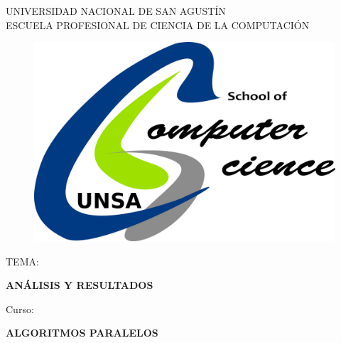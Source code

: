 

\begin{titlepage}

\begin{center}
\vspace*{-1in}

\begin{large}
UNIVERSIDAD NACIONAL DE SAN AGUSTÍN\\
\vspace*{0.15in}
ESCUELA PROFESIONAL DE CIENCIA DE LA COMPUTACIÓN\\
\vspace*{0.15in}
\end{large}
\begin{figure}[htb]
\centering
\includegraphics[scale=0.13]{logo.pdf}
\end{figure}
\vspace*{0.15in}
\begin{large}
TEMA:\\
\end{large}
\vspace*{0.2in}
\begin{Large}
\textbf{ANÁLISIS Y RESULTADOS} \\
\end{Large}
\vspace{8mm}

\begin{large}
Curso:\\
\end{large}
\vspace*{0.2in}
\begin{Large}
\textbf{ALGORITMOS PARALELOS} \\
\end{Large}


\end{center}
\end{titlepage}
